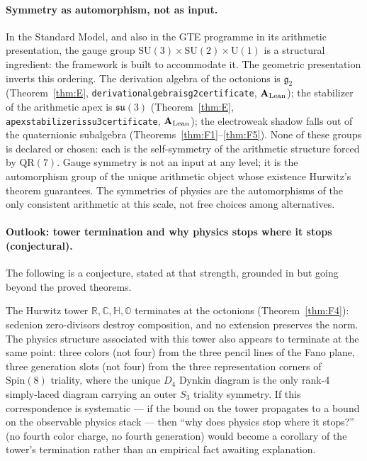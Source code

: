 \documentclass[11pt]{article}
\theoremstyle{remark}
\newcommand{\lean}[1]{%
  \penalty-100
  \begingroup\def\_{\textunderscore\allowbreak}\texttt{#1}\endgroup}
\newcommand{\CatAL}{\ensuremath{\textbf{A}_{\rm Lean}}}
\begin{document}
\paragraph{Symmetry as automorphism, not as input.}
In the Standard Model, and also in the GTE programme in its arithmetic
presentation, the gauge group
$\mathrm{SU}(3)\times\mathrm{SU}(2)\times\mathrm{U}(1)$ is a structural
ingredient: the framework is built to accommodate it.
The geometric presentation inverts this ordering.
The derivation algebra of the octonions is $\mathfrak{g}_2$ (Theorem~\ref{thm:E},
\lean{derivation\_algebra\_is\_g2\_certificate}, \CatAL);
the stabilizer of the arithmetic apex is $\mathfrak{su}(3)$
(Theorem~\ref{thm:E}, \lean{apex\_stabilizer\_is\_su3\_certificate}, \CatAL);
the electroweak shadow falls out of the quaternionic subalgebra
(Theorems~\ref{thm:F1}--\ref{thm:F5}).
None of these groups is declared or chosen: each is the self-symmetry of the
arithmetic structure forced by $\mathrm{QR}(7)$.
Gauge symmetry is not an input at any level; it is the automorphism group of
the unique arithmetic object whose existence Hurwitz's theorem guarantees.
The symmetries of physics are the automorphisms of the only consistent arithmetic
at this scale, not free choices among alternatives.

\paragraph{Outlook: tower termination and why physics stops where it stops
  (conjectural).}
The following is a conjecture, stated at that strength, grounded in but going
beyond the proved theorems.

The Hurwitz tower $\mathbb{R},\mathbb{C},\mathbb{H},\mathbb{O}$ terminates at
the octonions (Theorem~\ref{thm:F4}): sedenion zero-divisors destroy
composition, and no extension preserves the norm.
The physics structure associated with this tower also appears to terminate at
the same point: three colors (not four) from the three pencil lines of the
Fano plane, three generation slots (not four) from the three representation
corners of $\mathrm{Spin}(8)$ triality, where the unique $D_4$ Dynkin diagram
is the only rank-4 simply-laced diagram carrying an outer $S_3$ triality
symmetry.
If this correspondence is systematic --- if the bound on the tower propagates
to a bound on the observable physics stack --- then ``why does physics stop
where it stops?'' (no fourth color charge, no fourth generation) would become
a corollary of the tower's termination rather than an empirical fact awaiting
explanation.
\end{document}
